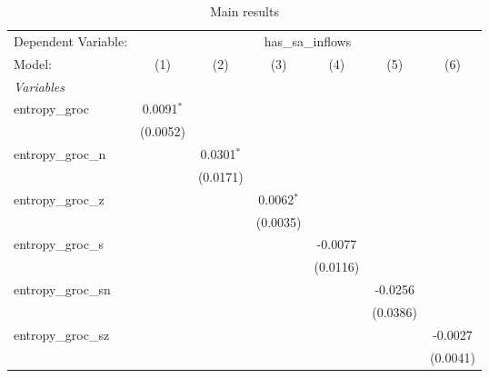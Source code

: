 
\begin{table}[htbp]
   \centering
   \caption{\label{tab:reg_has_sa_inflows_groc.tex} Main results}
   \begin{footnotesize}
      \begin{tabular}{lcccccc}
         \tabularnewline\midrule\midrule
         Dependent Variable: & \multicolumn{6}{c}{has\_sa\_inflows}\\
         Model:              & (1)            & (2)            & (3)            & (4)            & (5)            & (6)\\
         \midrule \emph{Variables} &   &   &   &   &   &  \\
         entropy\_groc      & 0.0091$^{*}$   &                &                &                &                &   \\
                             & (0.0052)       &                &                &                &                &   \\
         entropy\_groc\_n  &                & 0.0301$^{*}$   &                &                &                &   \\
                             &                & (0.0171)       &                &                &                &   \\
         entropy\_groc\_z  &                &                & 0.0062$^{*}$   &                &                &   \\
                             &                &                & (0.0035)       &                &                &   \\
         entropy\_groc\_s  &                &                &                & -0.0077        &                &   \\
                             &                &                &                & (0.0116)       &                &   \\
         entropy\_groc\_sn &                &                &                &                & -0.0256        &   \\
                             &                &                &                &                & (0.0386)       &   \\
         entropy\_groc\_sz &                &                &                &                &                & -0.0027\\
                             &                &                &                &                &                & (0.0041)\\

\end{tabular}
\end{footnotesize}
\end{table}
